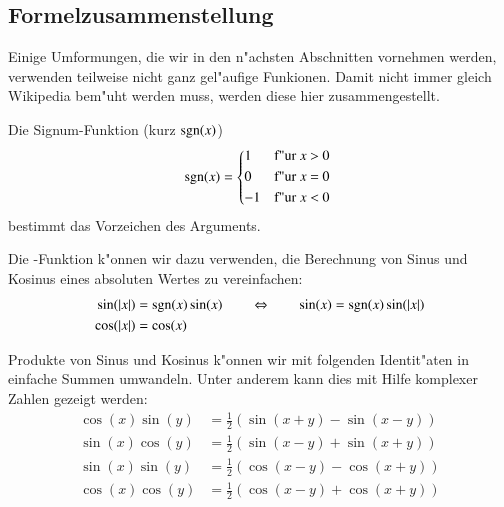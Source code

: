 \subsection{Formelzusammenstellung}
Einige Umformungen, die wir in den n"achsten Abschnitten vornehmen werden, 
verwenden teilweise nicht ganz gel"aufige Funkionen. Damit nicht immer gleich 
Wikipedia bem"uht werden muss, werden diese hier zusammengestellt.

Die Signum-Funktion (kurz $\sgn(x)$)
\begin{equation}
\sgn(x) =
\begin{cases*}
1 & f"ur $x$ > 0 \\
0 & f"ur $x$ = 0 \\
-1 & f"ur $x$ < 0
\end{cases*}
\label{equation:lorenz2:signum}
\end{equation}
bestimmt das Vorzeichen des Arguments.

Die \sgn-Funktion k"onnen wir dazu verwenden, die Berechnung von Sinus und 
Kosinus eines absoluten Wertes zu vereinfachen:
\begin{equation}
\begin{split}
\sin(|x|) &= \sgn(x)\sin(x) \qquad \Leftrightarrow \qquad \sin(x) = 
\sgn(x)\sin(|x|)
\\
\cos(|x|) &= \cos(x)
\end{split}
\label{equation:lorenz2:sincosabs}
\end{equation}

Produkte von Sinus und Kosinus k"onnen wir mit folgenden Identit"aten in 
einfache Summen umwandeln. Unter anderem kann dies mit Hilfe komplexer 
Zahlen gezeigt werden:
\begin{align*}
\cos(x)\sin(y) &= \frac{1}{2} \left(\sin(x + y) - \sin(x - y)\right)
\\
\sin(x)\cos(y) &= \frac{1}{2} \left(\sin(x - y) + \sin(x + y)\right)
\\
\sin(x)\sin(y) &= \frac{1}{2} \left(\cos(x - y) - \cos(x + y)\right)
\\
\cos(x)\cos(y) &= \frac{1}{2} \left(\cos(x - y) + \cos(x + y)\right)
\end{align*}
